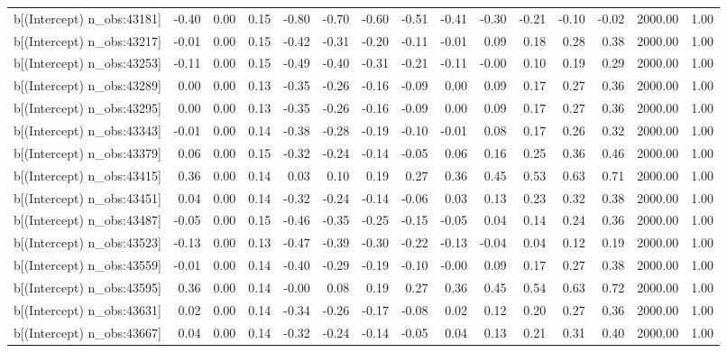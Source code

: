 \begin{table}[ht]
\begin{tabular}{rrrrrrrrrrrrrrr}
  b[(Intercept) n\_obs:43181] & -0.40 & 0.00 & 0.15 & -0.80 & -0.70 & -0.60 & -0.51 & -0.41 & -0.30 & -0.21 & -0.10 & -0.02 & 2000.00 & 1.00 \\ 
  b[(Intercept) n\_obs:43217] & -0.01 & 0.00 & 0.15 & -0.42 & -0.31 & -0.20 & -0.11 & -0.01 & 0.09 & 0.18 & 0.28 & 0.38 & 2000.00 & 1.00 \\ 
  b[(Intercept) n\_obs:43253] & -0.11 & 0.00 & 0.15 & -0.49 & -0.40 & -0.31 & -0.21 & -0.11 & -0.00 & 0.10 & 0.19 & 0.29 & 2000.00 & 1.00 \\ 
  b[(Intercept) n\_obs:43289] & 0.00 & 0.00 & 0.13 & -0.35 & -0.26 & -0.16 & -0.09 & 0.00 & 0.09 & 0.17 & 0.27 & 0.36 & 2000.00 & 1.00 \\ 
  b[(Intercept) n\_obs:43295] & 0.00 & 0.00 & 0.13 & -0.35 & -0.26 & -0.16 & -0.09 & 0.00 & 0.09 & 0.17 & 0.27 & 0.36 & 2000.00 & 1.00 \\ 
  b[(Intercept) n\_obs:43343] & -0.01 & 0.00 & 0.14 & -0.38 & -0.28 & -0.19 & -0.10 & -0.01 & 0.08 & 0.17 & 0.26 & 0.32 & 2000.00 & 1.00 \\ 
  b[(Intercept) n\_obs:43379] & 0.06 & 0.00 & 0.15 & -0.32 & -0.24 & -0.14 & -0.05 & 0.06 & 0.16 & 0.25 & 0.36 & 0.46 & 2000.00 & 1.00 \\ 
  b[(Intercept) n\_obs:43415] & 0.36 & 0.00 & 0.14 & 0.03 & 0.10 & 0.19 & 0.27 & 0.36 & 0.45 & 0.53 & 0.63 & 0.71 & 2000.00 & 1.00 \\ 
  b[(Intercept) n\_obs:43451] & 0.04 & 0.00 & 0.14 & -0.32 & -0.24 & -0.14 & -0.06 & 0.03 & 0.13 & 0.23 & 0.32 & 0.38 & 2000.00 & 1.00 \\ 
  b[(Intercept) n\_obs:43487] & -0.05 & 0.00 & 0.15 & -0.46 & -0.35 & -0.25 & -0.15 & -0.05 & 0.04 & 0.14 & 0.24 & 0.36 & 2000.00 & 1.00 \\ 
  b[(Intercept) n\_obs:43523] & -0.13 & 0.00 & 0.13 & -0.47 & -0.39 & -0.30 & -0.22 & -0.13 & -0.04 & 0.04 & 0.12 & 0.19 & 2000.00 & 1.00 \\ 
  b[(Intercept) n\_obs:43559] & -0.01 & 0.00 & 0.14 & -0.40 & -0.29 & -0.19 & -0.10 & -0.00 & 0.09 & 0.17 & 0.27 & 0.38 & 2000.00 & 1.00 \\ 
  b[(Intercept) n\_obs:43595] & 0.36 & 0.00 & 0.14 & -0.00 & 0.08 & 0.19 & 0.27 & 0.36 & 0.45 & 0.54 & 0.63 & 0.72 & 2000.00 & 1.00 \\ 
  b[(Intercept) n\_obs:43631] & 0.02 & 0.00 & 0.14 & -0.34 & -0.26 & -0.17 & -0.08 & 0.02 & 0.12 & 0.20 & 0.27 & 0.36 & 2000.00 & 1.00 \\ 
  b[(Intercept) n\_obs:43667] & 0.04 & 0.00 & 0.14 & -0.32 & -0.24 & -0.14 & -0.05 & 0.04 & 0.13 & 0.21 & 0.31 & 0.40 & 2000.00 & 1.00 \\ 

\end{tabular}
\end{table}
